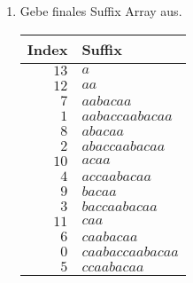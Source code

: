 \begin{enumerate}
\item 
Gebe finales Suffix Array aus.
\begin{center}
\small\begin{tabular}{rl}
\toprule 
 Index & Suffix \\
\midrule 
  $13$ & $a$ \\
  $12$ & $aa$ \\
  $ 7$ & $aabacaa$ \\
  $ 1$ & $aabaccaabacaa$ \\
  $ 8$ & $abacaa$ \\
  $ 2$ & $abaccaabacaa$ \\
  $10$ & $acaa$ \\
  $ 4$ & $accaabacaa$ \\
  $ 9$ & $bacaa$ \\
  $ 3$ & $baccaabacaa$ \\
  $11$ & $caa$ \\
  $ 6$ & $caabacaa$ \\
  $ 0$ & $caabaccaabacaa$ \\
  $ 5$ & $ccaabacaa$ \\
\bottomrule 
\end{tabular}\\
\end{center}
\end{enumerate}
